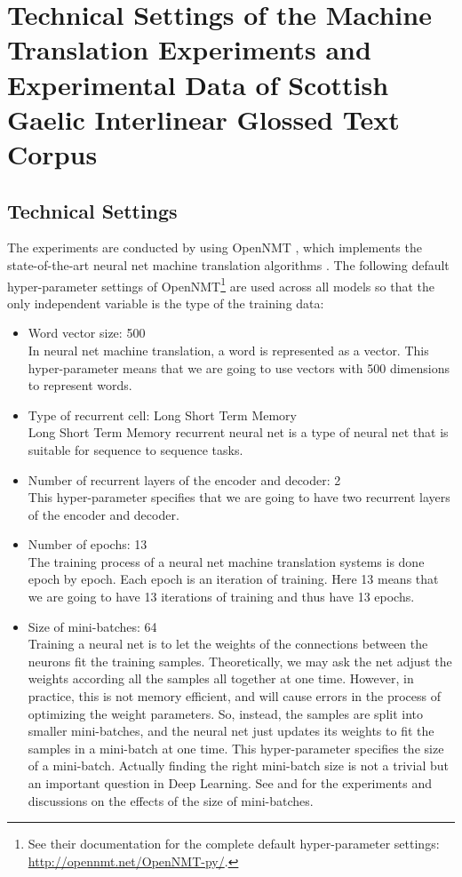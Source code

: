 \documentclass[final]{ua-thesis}
\numberwithin{equation}{section}
\begin{document}

\section{Technical Settings of the Machine Translation Experiments and Experimental Data of Scottish Gaelic Interlinear Glossed Text Corpus}\label{sec:experimet_setting}

\subsection{Technical Settings}
The experiments are conducted by using OpenNMT \citep{2017opennmt}, which implements the state-of-the-art neural net machine translation algorithms \citep{cho2014properties, cho2014learning, bahdanau2014neural}.
The following default hyper-parameter settings of OpenNMT\footnote{See their documentation for the complete default hyper-parameter settings: \url{http://opennmt.net/OpenNMT-py/}.} are used across all models so that the only independent variable is the type of the training data:
	\begin{itemize}
	\item Word vector size: 500\\
	In neural net machine translation, a word is represented as a vector. This hyper-parameter means that we are going to use vectors with 500 dimensions to represent words.
	\item Type of recurrent cell: Long Short Term Memory\\
	Long Short Term Memory recurrent neural net is a type of neural net that is suitable for sequence to sequence tasks.  
	\item Number of recurrent layers of the encoder and decoder: 2\\
	This hyper-parameter specifies that we are going to have two recurrent layers of the encoder and decoder. 
	\item Number of epochs: 13\\
	The training process of a neural net machine translation systems is done epoch by epoch. Each epoch is an iteration of training. Here 13 means that we are going to have 13 iterations of training and thus have 13 epochs. 
	\item Size of mini-batches: 64\\
	Training a neural net is to let the weights of the connections between the neurons fit the training samples. Theoretically, we may ask the net adjust the weights according all the samples all together at one time. However, in practice, this is not memory efficient, and will cause errors in the process of optimizing the weight parameters. So, instead, the samples are split into smaller mini-batches, and the neural net just updates its weights to fit the samples in a mini-batch at one time. This hyper-parameter specifies the size of a mini-batch. Actually finding the right mini-batch size is not a trivial but an important question in Deep Learning. See \citet{DBLP:journals/corr/KeskarMNST16} and \citet{DBLP:journals/corr/abs-1711-00489} for the experiments and discussions on the effects of the size of mini-batches. 
	\end{itemize}
\end{document}
